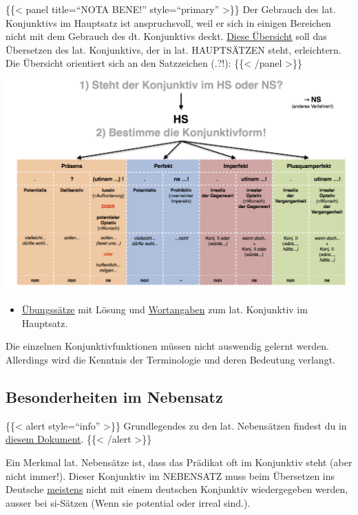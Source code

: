 \documentclass{scrartcl}
\begin{document}
\{\{< panel title="`NOTA BENE!"' style="`primary"' >\}\} Der Gebrauch des lat. Konjunktivs im Hauptsatz ist anspruchsvoll,
weil er sich in einigen Bereichen nicht mit dem Gebrauch des
dt. Konjunktivs deckt. \href{https://www.dropbox.com/s/k03cq5ysu5of1ha/KonjunktivHS.pdf?dl=0}{Diese Übersicht} soll das Übersetzen des
lat. Konjunktivs, der in lat. HAUPTSÄTZEN steht, erleichtern. Die
Übersicht orientiert sich an den Satzzeichen (.?!):
\{\{< /panel >\}\}


\begin{center}
\includegraphics[width=.9\linewidth]{KonjHS.jpg}
\label{orgbc810c8}
\end{center} 

\begin{itemize}
\item \href{https://www.dropbox.com/s/sltkmozc04i5xwl/Konjunktiv.pdf?dl=0}{Übungssätze} mit Lösung und \href{https://www.dropbox.com/s/uicgeuj6n24kj97/Konjunktiv\_Wortangaben.pdf?dl=0}{Wortangaben} zum lat. Konjunktiv im
Hauptsatz.
\end{itemize}


Die einzelnen Konjunktivfunktionen müssen nicht auswendig gelernt werden.
Allerdings wird die Kenntnis der Terminologie und deren Bedeutung verlangt.


\subsection{Besonderheiten im Nebensatz}
\label{sec:org385dd85}


\{\{< alert style="`info"' >\}\} Grundlegendes zu den lat. Nebensätzen findest du in \href{https://www.dropbox.com/s/fw6yy5i00lxn5iy/Lat\_Nebens\%25C3\%25A4tze.pdf?dl=0}{diesem Dokument}. \{\{< /alert >\}\}



Ein Merkmal lat. Nebensätze ist, dass das Prädikat oft im Konjunktiv
steht (aber nicht immer!). Dieser Konjunktiv im NEBENSATZ muss beim
Übersetzen ins Deutsche \uline{meistens} nicht mit einem deutschen Konjunktiv
wiedergegeben werden, ausser bei si-Sätzen (Wenn sie potential oder irreal sind.).
\end{document}
